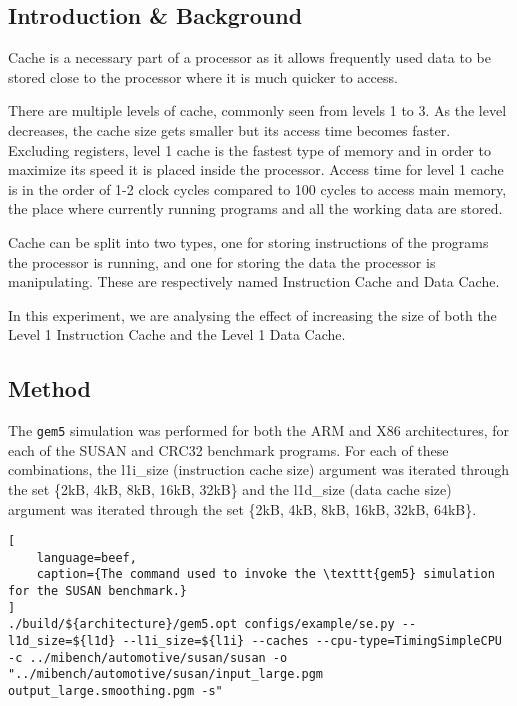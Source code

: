 
\subsection{Introduction \& Background}

Cache is a necessary part of a processor as it allows frequently used data to be stored
close to the processor where it is much quicker to access.

There are multiple levels of cache, commonly seen from levels 1 to 3.
As the level decreases, the cache size gets smaller but its access time becomes faster.
Excluding registers, level 1 cache is the fastest type of memory and in order to maximize
its speed it is placed inside the processor.
Access time for level 1 cache is in the order of 1-2 clock cycles compared to 100 cycles
to access main memory, the place where currently running programs and all the working
data are stored.

Cache can be split into two types, one for storing instructions of the programs the
processor is running, and one for storing the data the processor is manipulating.
These are respectively named Instruction Cache and Data Cache.

In this experiment, we are analysing the effect of increasing the size of both the
Level 1 Instruction Cache and the Level 1 Data Cache.

\subsection{Method}

The \texttt{gem5} simulation was performed for both the ARM and X86 architectures, for
each of the SUSAN and CRC32 benchmark programs.
For each of these combinations, the l1i\_size (instruction cache size) argument was 
iterated through the set \{2kB, 4kB, 8kB, 16kB, 32kB\} and the l1d\_size (data cache size) 
argument was iterated through the set \{2kB, 4kB, 8kB, 16kB, 32kB, 64kB\}.

\begin{lstlisting}[
    language=beef,
    caption={The command used to invoke the \texttt{gem5} simulation for the SUSAN benchmark.}
]
./build/${architecture}/gem5.opt configs/example/se.py --l1d_size=${l1d} --l1i_size=${l1i} --caches --cpu-type=TimingSimpleCPU -c ../mibench/automotive/susan/susan -o "../mibench/automotive/susan/input_large.pgm output_large.smoothing.pgm -s"
\end{lstlisting}

